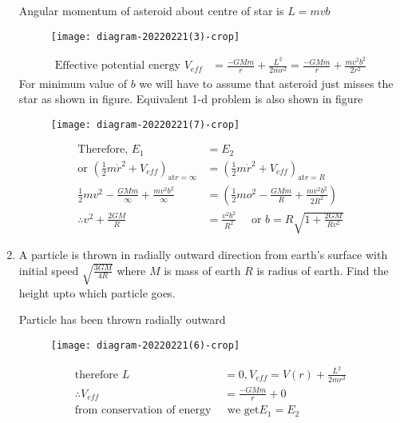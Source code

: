 \begin{enumerate}
	\begin{answer}
		Angular momentum of asteroid about centre of star is $L=m v b$
		\begin{figure}[H]
			\centering
			\texttt{[image: diagram-20220221(3)-crop]}
		\end{figure}
		\begin{align*}
		\text{Effective potential energy }V_{e f f}&=\frac{-G M m}{r}+\frac{L^{2}}{2 m r^{2}}=\frac{-G M m}{r}+\frac{m v^{2} b^{2}}{2 r^{2}}
		\end{align*}
		For minimum value of $b$ we will have to assume that asteroid just misses the star as shown in figure. Equivalent 1-d problem is also shown in figure
		\begin{figure}[H]
			\centering
			\texttt{[image: diagram-20220221(7)-crop]}
		\end{figure}
		\begin{align*}
		\text{Therefore, }E_{1}&=E_{2}\\
		\text{or }\left(\frac{1}{2} m \dot{r}^{2}+V_{e f f}\right)_{\mathrm{at} r=\infty}&=\left(\frac{1}{2} m \dot{r}^{2}+V_{e f f}\right)_{\mathrm{at} r=R}\\
		\frac{1}{2} m v^{2}-\frac{G M m}{\infty}+\frac{m v^{2} b^{2}}{\infty}&=\left(\frac{1}{2} m o^{2}-\frac{G M m}{R}+\frac{m v^{2} b^{2}}{2 R^{2}}\right)\\
		\therefore v^{2}+\frac{2 G M}{R}&=\frac{v^{2} b^{2}}{R^{2}} \quad \text { or } b=R \sqrt{1+\frac{2 G M}{R v^{2}}}
		\end{align*}
	\end{answer}
	\item  A particle is thrown in radially outward direction from earth's surface with initial speed $\sqrt{\frac{3 G M}{4 R}}$ where $M$ is mass of earth $R$ is radius of earth. Find the height upto which particle goes.
	\begin{answer}
		Particle has been thrown radially outward 
		\begin{figure}[H]
			\centering
			\texttt{[image: diagram-20220221(6)-crop]}
		\end{figure}
		\begin{align*}
		\text{therefore }L&=0, V_{e f f}=V(r)+\frac{L^{2}}{2 m r^{2}}\\
		\therefore V_{e f f}&=\frac{-G M m}{r}+0\\
		\text{from conservation of energy }&\text{ we get}E_{1}=E_{2}\\

\end{align*}
\end{answer}
\end{enumerate}
